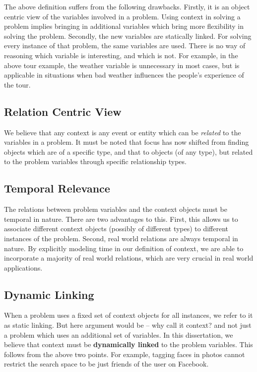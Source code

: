 The above definition suffers from the following drawbacks. Firstly, it is an object centric view of the variables involved in a problem. Using context in solving a problem implies bringing in additional variables which bring more flexibility in solving the problem. Secondly, the new variables are statically linked. For solving every instance of that problem, the same variables are used. There is no way of reasoning which variable is interesting, and which is not. For example, in the above tour example, the weather variable is unnecessary in most cases, but is applicable in situations when bad weather influences the people's experience of the tour. 

\subsection{Relation Centric View}
We believe that any context is any event or entity which can be \textit{related} to the variables in a problem. It must be noted that focus has now shifted from finding objects which are of a specific type, and that to objects (of any type), but related to the problem variables through specific relationship types.

\subsection{Temporal Relevance}
The relations between problem variables and the context objects must be temporal in nature. There are two advantages to this. First, this allows us to associate different context objects (possibly of different types) to different instances of the problem. Second, real world relations are always temporal in nature. By explicitly modeling time in our definition of context, we are able to incorporate a majority of real world relations, which are very crucial in real world applications.

\subsection{Dynamic Linking}
When a problem uses a fixed set of context objects for all instances, we refer to it as static linking. But here argument would be -- why call it context? and not just a problem which uses an additional set of variables. In this dissertation, we believe that context must be \textbf{dynamically linked} to the problem variables. This follows from the above two points. For example, tagging faces in photos cannot restrict the search space to be just friends of the user on Facebook. 

